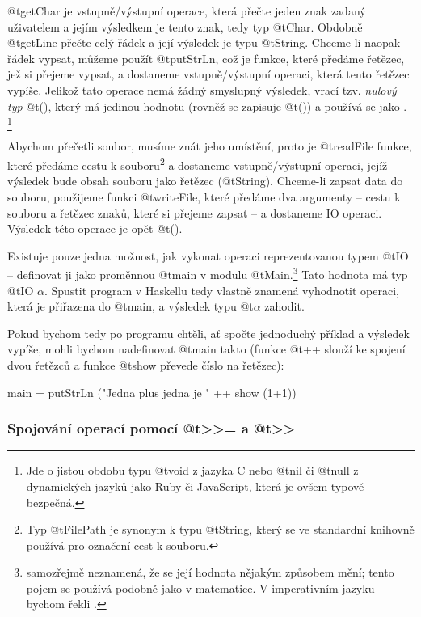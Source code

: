 @t{getChar} je vstupně/výstupní operace, která přečte jeden znak zadaný
uživatelem a jejím výsledkem je tento znak, tedy typ @t{Char}. Obdobně
@t{getLine} přečte celý řádek a její výsledek je typu @t{String}. Chceme-li
naopak řádek vypsat, můžeme použít @t{putStrLn}, což je funkce, které předáme
řetězec, jež si přejeme vypsat, a dostaneme vstupně/výstupní operaci, která
tento řetězec vypíše. Jelikož tato operace nemá žádný smyslupný výsledek, vrací
tzv. \emph{nulový typ} @t{()}, který má jedinou hodnotu (rovněž se zapisuje
@t{()}) a používá se jako . \footnote{Jde o jistou obdobu typu @t{void} z
jazyka C nebo @t{nil} či @t{null} z dynamických jazyků jako Ruby či JavaScript,
která je ovšem typově bezpečná.}

Abychom přečetli soubor, musíme znát jeho umístění, proto je @t{readFile}
funkce, které předáme cestu k souboru\footnote{Typ @t{FilePath} je synonym k
  typu @t{String}, který se ve standardní knihovně používá pro označení cest k
souboru.} a dostaneme vstupně/výstupní operaci, jejíž výsledek bude obsah
souboru jako řetězec (@t{String}). Chceme-li zapsat data do souboru, použijeme
funkci @t{writeFile}, které předáme dva argumenty -- cestu k souboru a řetězec
znaků, které si přejeme zapsat -- a dostaneme IO operaci. Výsledek této operace
je opět @t{()}.

Existuje pouze jedna možnost, jak vykonat operaci reprezentovanou typem @t{IO}
-- definovat ji jako proměnnou @t{main} v modulu
@t{Main}.\footnote{ samozřejmě neznamená, že se její hodnota
  nějakým způsobem mění; tento pojem se používá podobně jako v matematice. V
imperativním jazyku bychom řekli .} Tato hodnota má typ @t{IO
$\alpha$}. Spustit program v Haskellu tedy vlastně znamená vyhodnotit operaci,
která je přiřazena do @t{main}, a výsledek typu @t{$\alpha$} zahodit.

Pokud bychom tedy po programu chtěli, ať spočte jednoduchý příklad a výsledek
vypíše, mohli bychom nadefinovat @t{main} takto (funkce @t{++} slouží ke spojení
dvou řetězců a funkce @t{show} převede číslo na řetězec):

\begin{haskell}
main = putStrLn ("Jedna plus jedna je " ++ show (1+1))
\end{haskell}

\subsubsection{\texorpdfstring
  {Spojování operací pomocí @t{>>=} a @t{>>}}
  {Spojování operací pomocí >>= a >>}}

